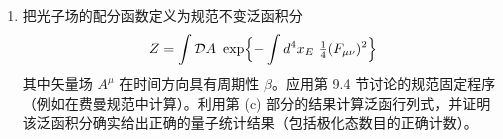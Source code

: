 \begin{enumerate}[label=(\alph*)]
    也就是说，对应于一个简单的二能级系统。计算泛函积分，假设费米子满足反周期边界条件：$\psi(t+\beta) = -\psi(t)$。（为什么这是合理的？）证明结果重现量子力学二能级系统的配分函数，即费米统计量子态的配分函数。
  \item 把光子场的配分函数定义为规范不变泛函积分
    \begin{equation}
      Z = \int \mathcal{D}A\ \exp\Bigl\{ -\int d^4x_E\
        \tfrac{1}{4}(F_{\mu\nu})^2 \Bigr\}
    \end{equation}
    其中矢量场 $A^\mu$ 在时间方向具有周期性 $\beta$。应用第 9.4 节讨论的规范固定程序（例如在费曼规范中计算）。利用第 (c) 部分的结果计算泛函行列式，并证明该泛函积分确实给出正确的量子统计结果（包括极化态数目的正确计数）。
\end{enumerate}
